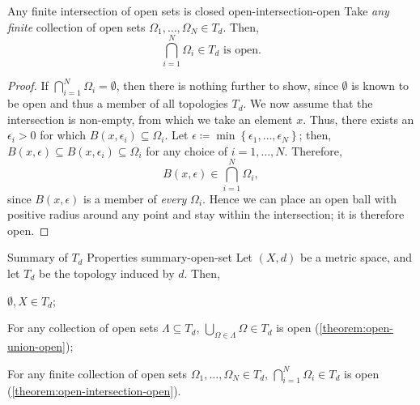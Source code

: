 \documentclass{article}
\numberwithin{equation}{section}
\numberwithin{figure}{section}
\newcommand*\setaxiomprefix[1]{
    \setlist[axioms]{label=#1\arabic*), ref=#1\arabic*}
}
\begin{document}
\begin{theorem}{Any finite intersection of open sets is closed}
        {open-intersection-open}
    Take \emph{any finite} collection of open sets $ \Omega_1, \ldots, \Omega_N
    \in T_d $. Then,
    \begin{equation}
        \bigcap_{i=1}^N \Omega_i \in T_d \text{ is open.}
    \end{equation}
    \begin{proof}
        If $ \bigcap_{i=1}^N \Omega_i = \emptyset $, then there is nothing
        further to show, since $ \emptyset $ is known to be open and thus a
        member of all topologies $ T_d $. We now assume that the intersection is
        non-empty, from which we take an element $ x $. Thus, there exists an $
        \epsilon_i > 0 $ for which $ B(x, \epsilon_i) \subseteq \Omega_i $. Let
        $ \epsilon \coloneq \min\left\{ \epsilon_1, \ldots, \epsilon_N \right\}
        $; then, $ B(x, \epsilon) \subseteq B(x, \epsilon_i) \subseteq \Omega_i
        $ for any choice of $ i = 1, \ldots, N $. Therefore,
        \begin{equation}
            B(x, \epsilon) \in \bigcap_{i=1}^N \Omega_i,
        \end{equation}
        since $ B(x, \epsilon) $ is a member of \emph{every} $ \Omega_i $. Hence
        we can place an open ball with positive radius around any point and stay
        within the intersection; it is therefore open.
    \end{proof}
    \centering
\end{theorem}
\begin{theorem}{Summary of \texorpdfstring{$ T_d $}{Open Set} Properties}
        {summary-open-set}
    Let $ (X, d) $ be a metric space, and let $ T_d $ be the topology induced by
    $ d $. Then,
    \setaxiomprefix{T}
    \begin{axioms}
        \item $ \emptyset, X \in T_d $;
        \item For any collection of open sets $ \Lambda \subseteq T_d $,
            $ \bigcup_{\Omega \in \Lambda} \Omega \in T_d $ is open
            (\cref{theorem:open-union-open});\label{axiom:open-union-open}
        \item For any finite collection of open sets $ \Omega_1, \ldots,
            \Omega_N \in T_d $, $ \bigcap_{i=1}^N \Omega_i \in T_d $ is open
            (\cref{theorem:open-intersection-open}).
    \end{axioms}
\end{theorem}
\end{document}
